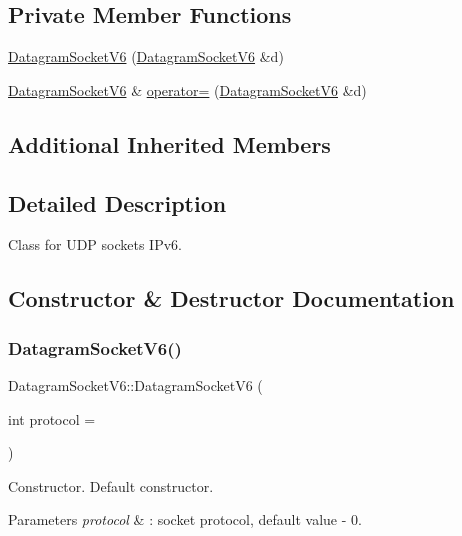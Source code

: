 \subsection*{Private Member Functions}
\begin{DoxyCompactItemize}
\item 
\hyperlink{classDatagramSocketV6_abafce8dec242d3f9899ddcc5dfa11761}{Datagram\+Socket\+V6} (\hyperlink{classDatagramSocketV6}{Datagram\+Socket\+V6} \&d)
\item 
\hyperlink{classDatagramSocketV6}{Datagram\+Socket\+V6} \& \hyperlink{classDatagramSocketV6_a0c09ba2187bbbf0fceeba81d96d111b7}{operator=} (\hyperlink{classDatagramSocketV6}{Datagram\+Socket\+V6} \&d)
\end{DoxyCompactItemize}
\subsection*{Additional Inherited Members}


\subsection{Detailed Description}
Class for U\+DP sockets I\+Pv6. 

\subsection{Constructor \& Destructor Documentation}
\mbox{\label{classDatagramSocketV6_a6ef4a140f2eca611448413ef768ffee3}} 
\subsubsection{\texorpdfstring{Datagram\+Socket\+V6()}{DatagramSocketV6()}\hspace{0.1cm}{\footnotesize\ttfamily [1/2]}}
{\footnotesize\ttfamily Datagram\+Socket\+V6\+::\+Datagram\+Socket\+V6 (\begin{DoxyParamCaption}\item[{int}]{protocol = {} }\end{DoxyParamCaption})}

Constructor. Default constructor. 
\begin{DoxyParams}{Parameters}
{\em protocol} & \+: socket protocol, default value -\/ 0. \\
\hline
\end{DoxyParams}

